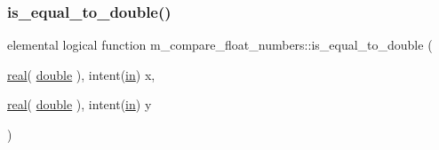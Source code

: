 \mbox{\label{namespacem__compare__float__numbers_a086e7c43d2dca1f8238afd6548e2704e}} 
\subsubsection{\texorpdfstring{is\+\_\+equal\+\_\+to\+\_\+double()}{is\_equal\_to\_double()}}
{\footnotesize\ttfamily elemental logical function m\+\_\+compare\+\_\+float\+\_\+numbers\+::is\+\_\+equal\+\_\+to\+\_\+double (\begin{DoxyParamCaption}\item[{\hyperlink{read__watch_83_8txt_abdb62bde002f38ef75f810d3a905a823}{real}( \hyperlink{namespacem__compare__float__numbers_af4b789cd6e1a2abcd412eaf29e91ea0c}{double} ), intent(\hyperlink{M__journal_83_8txt_afce72651d1eed785a2132bee863b2f38}{in})}]{x,  }\item[{\hyperlink{read__watch_83_8txt_abdb62bde002f38ef75f810d3a905a823}{real}( \hyperlink{namespacem__compare__float__numbers_af4b789cd6e1a2abcd412eaf29e91ea0c}{double} ), intent(\hyperlink{M__journal_83_8txt_afce72651d1eed785a2132bee863b2f38}{in})}]{y }\end{DoxyParamCaption})\hspace{0.3cm}{\ttfamily [private]}}

\mbox{\label{namespacem__compare__float__numbers_a77dbaa3c42872d0366a3c5c2d99664d2}} 
